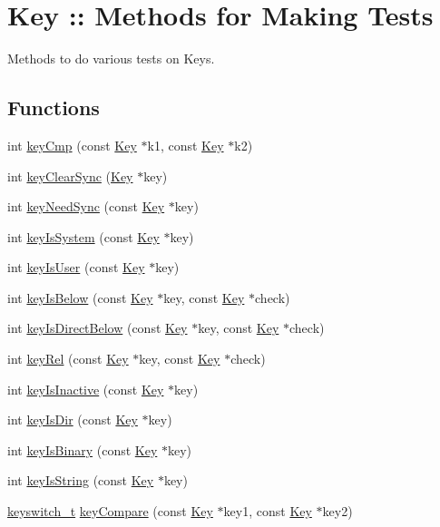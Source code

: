 \hypertarget{group__keytest}{
\section{Key :: Methods for Making Tests}
\label{group__keytest}
}


Methods to do various tests on Keys.  


\subsection*{Functions}
\begin{DoxyCompactItemize}
\item 
int \hyperlink{group__keytest_gaf6e66e12fe04d535a5d1c8218ced803e}{keyCmp} (const \hyperlink{struct__Key}{Key} $\ast$k1, const \hyperlink{struct__Key}{Key} $\ast$k2)
\item 
int \hyperlink{group__keytest_ga6a994eebd4b1c253d4912fa80df16506}{keyClearSync} (\hyperlink{struct__Key}{Key} $\ast$key)
\item 
int \hyperlink{group__keytest_gaf247df0de7aca04b32ef80e39ef12950}{keyNeedSync} (const \hyperlink{struct__Key}{Key} $\ast$key)
\item 
int \hyperlink{group__keytest_gafe49cfb61c2accb3073131c23a56fb14}{keyIsSystem} (const \hyperlink{struct__Key}{Key} $\ast$key)
\item 
int \hyperlink{group__keytest_ga373acc20c6209357045891f4b0c70041}{keyIsUser} (const \hyperlink{struct__Key}{Key} $\ast$key)
\item 
int \hyperlink{group__keytest_ga03332b5d97c76a4fd2640aca4762b8df}{keyIsBelow} (const \hyperlink{struct__Key}{Key} $\ast$key, const \hyperlink{struct__Key}{Key} $\ast$check)
\item 
int \hyperlink{group__keytest_ga4f175aafd98948ce6c774f3bd92b72ca}{keyIsDirectBelow} (const \hyperlink{struct__Key}{Key} $\ast$key, const \hyperlink{struct__Key}{Key} $\ast$check)
\item 
int \hyperlink{group__keytest_ga6bb0f95ac34ce9c42d61bb35a76139d0}{keyRel} (const \hyperlink{struct__Key}{Key} $\ast$key, const \hyperlink{struct__Key}{Key} $\ast$check)
\item 
int \hyperlink{group__keytest_gaa25f699f592031c1a0abc1504d14e13e}{keyIsInactive} (const \hyperlink{struct__Key}{Key} $\ast$key)
\item 
int \hyperlink{group__keytest_gac0a10c602d52a35f81347e8a32312017}{keyIsDir} (const \hyperlink{struct__Key}{Key} $\ast$key)
\item 
int \hyperlink{group__keytest_ga9526b371087564e43e3dff8ad0dac949}{keyIsBinary} (const \hyperlink{struct__Key}{Key} $\ast$key)
\item 
int \hyperlink{group__keytest_gaea7670778abd07fee0fe8ac12a149190}{keyIsString} (const \hyperlink{struct__Key}{Key} $\ast$key)
\item 
\hyperlink{group__key_ga91fb3178848bd682000958089abbaf40}{keyswitch\_\-t} \hyperlink{group__keytest_gab98168409d302fdb65692f6e26f17945}{keyCompare} (const \hyperlink{struct__Key}{Key} $\ast$key1, const \hyperlink{struct__Key}{Key} $\ast$key2)
\end{DoxyCompactItemize}


